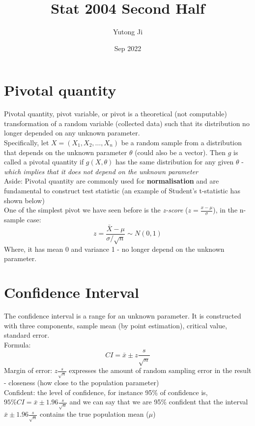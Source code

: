\documentclass[12pt ]{article}
\title{Stat 2004 Second Half}
\author{Yutong Ji}
\date{Sep  2022}
\begin{document}
\maketitle

\section{Pivotal quantity}
Pivotal quantity, pivot variable, or pivot is a theoretical (not computable) transformation of a random variable (collected data) such that its distribution no longer depended on any unknown parameter. \\

Specifically, let $X = (X_{1}, X_{2}, \ldots, X_{n})$ be a random sample from a distribution that depends on the unknown parameter $\theta$ (could also be a vector). Then $g$ is called a pivotal quantity if $g(X, \theta)$ has the same distribution for any given $\theta$ - \textit{which implies that it does not depend on the unknown parameter} \\
\color{brown}
Aside: Pivotal quantity are commonly used for \textbf{normalisation} and are fundamental to construct test statistic (an example of Student's t-statistic has shown below)\\
\color{black}
One of the simplest pivot we have seen before is the \textit{z-score} ($z=\frac{x-\mu}{\sigma}$), in the n-sample case:
\begin{equation*}
z=\frac{\bar{X} - \mu}{\sigma / \sqrt{n}} \sim N(0,1)
\end{equation*}
Where, it has mean 0 and variance 1 - no longer depend on the unknown parameter.

\section{Confidence Interval}
The confidence interval is a range for an unknown parameter. It is constructed with three components, sample mean (by point estimation), critical value, standard error. \\
Formula:
\begin{equation*}
CI = \bar{x} \pm z\frac{s}{\sqrt{n}}
\end{equation*}
Margin of error: $z\frac{s}{\sqrt{n}}$ expresses the amount of random sampling error in the result - closeness (how close to the population parameter) \\ 
Confident: the level of confidence, for instance 95\% of confidence is, $95\%CI = \bar{x} \pm 1.96\frac{s}{\sqrt{n}}$ and we can say that we are 95\% confident that the interval 
$\bar{x} \pm 1.96\frac{s}{\sqrt{n}}$ contains the true population mean ($\mu$) \\
\end{document}

